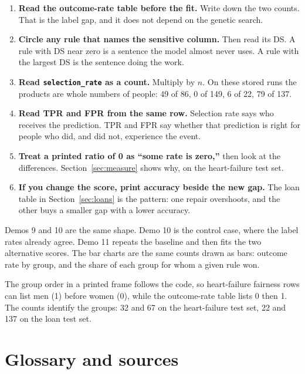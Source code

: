 \documentclass[11pt]{article}
\newcommand{\fn}[1]{\texttt{\small #1}}
\begin{document}
\begin{enumerate}
  \item \textbf{Read the outcome-rate table before the fit.} Write down the two counts. That is the label gap, and it does not depend on the genetic search.
  \item \textbf{Circle any rule that names the sensitive column.} Then read its DS. A rule with DS near zero is a sentence the model almost never uses. A rule with the largest DS is the sentence doing the work.
  \item \textbf{Read \fn{selection\_rate} as a count.} Multiply by \(n\). On these stored runs the products are whole numbers of people: 49 of 86, 0 of 149, 6 of 22, 79 of 137.
  \item \textbf{Read TPR and FPR from the same row.} Selection rate says who receives the prediction. TPR and FPR say whether that prediction is right for people who did, and did not, experience the event.
  \item \textbf{Treat a printed ratio of 0 as ``some rate is zero,''} then look at the differences. Section~\ref{sec:measure} shows why, on the heart-failure test set.
  \item \textbf{If you change the score, print accuracy beside the new gap.} The loan table in Section~\ref{sec:loans} is the pattern: one repair overshoots, and the other buys a smaller gap with a lower accuracy.
\end{enumerate}

Demos 9 and 10 are the same shape. Demo 10 is the control case, where the label rates already agree. Demo 11 repeats the baseline and then fits the two alternative scores. The bar charts are the same counts drawn as bars: outcome rate by group, and the share of each group for whom a given rule won.

The group order in a printed frame follows the code, so heart-failure fairness rows can list men (1) before women (0), while the outcome-rate table lists 0 then 1. The counts identify the groups: 32 and 67 on the heart-failure test set, 22 and 137 on the loan test set.

\section{Glossary and sources}
\label{sec:glossary}
\end{document}
